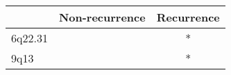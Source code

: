 \begin{tabular}{lcc}
\toprule
{} & Non-recurrence & Recurrence \\
\midrule
6q22.31 &                &          * \\
9q13    &                &          * \\
\bottomrule
\end{tabular}
